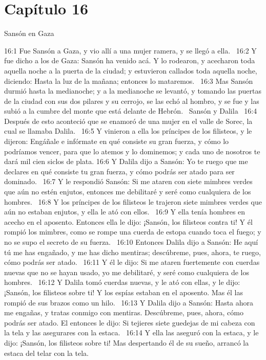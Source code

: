 \section*{Capítulo 16}

Sansón en Gaza  

16:1 Fue Sansón a Gaza, y vio allí a una mujer ramera, y se llegó a ella.  
16:2 Y fue dicho a los de Gaza: Sansón ha venido acá. Y lo rodearon, y acecharon toda aquella noche a la puerta de la ciudad; y estuvieron callados toda aquella noche, diciendo: Hasta la luz de la mañana; entonces lo mataremos.  
16:3 Mas Sansón durmió hasta la medianoche; y a la medianoche se levantó, y tomando las puertas de la ciudad con sus dos pilares y su cerrojo, se las echó al hombro, y se fue y las subió a la cumbre del monte que está delante de Hebrón.  
Sansón y Dalila  
16:4 Después de esto aconteció que se enamoró de una mujer en el valle de Sorec, la cual se llamaba Dalila.  
16:5 Y vinieron a ella los príncipes de los filisteos, y le dijeron: Engáñale e infórmate en qué consiste su gran fuerza, y cómo lo podríamos vencer, para que lo atemos y lo dominemos; y cada uno de nosotros te dará mil cien siclos de plata. 
16:6 Y Dalila dijo a Sansón: Yo te ruego que me declares en qué consiste tu gran fuerza, y cómo podrás ser atado para ser dominado.  
16:7 Y le respondió Sansón: Si me ataren con siete mimbres verdes que aún no estén enjutos, entonces me debilitaré y seré como cualquiera de los hombres.  
16:8 Y los príncipes de los filisteos le trajeron siete mimbres verdes que aún no estaban enjutos, y ella le ató con ellos.  
16:9 Y ella tenía hombres en acecho en el aposento. Entonces ella le dijo: ¡Sansón, los filisteos contra ti! Y él rompió los mimbres, como se rompe una cuerda de estopa cuando toca el fuego; y no se supo el secreto de su fuerza.  
16:10 Entonces Dalila dijo a Sansón: He aquí tú me has engañado, y me has dicho mentiras; descúbreme, pues, ahora, te ruego, cómo podrás ser atado.  
16:11 Y él le dijo: Si me ataren fuertemente con cuerdas nuevas que no se hayan usado, yo me debilitaré, y seré como cualquiera de los hombres.  
16:12 Y Dalila tomó cuerdas nuevas, y le ató con ellas, y le dijo: ¡Sansón, los filisteos sobre ti! Y los espías estaban en el aposento. Mas él las rompió de sus brazos como un hilo.  
16:13 Y Dalila dijo a Sansón: Hasta ahora me engañas, y tratas conmigo con mentiras. Descúbreme, pues, ahora, cómo podrás ser atado. El entonces le dijo: Si tejieres siete guedejas de mi cabeza con la tela y las asegurares con la estaca.  
16:14 Y ella las aseguró con la estaca, y le dijo: ¡Sansón, los filisteos sobre ti! Mas despertando él de su sueño, arrancó la estaca del telar con la tela.  
